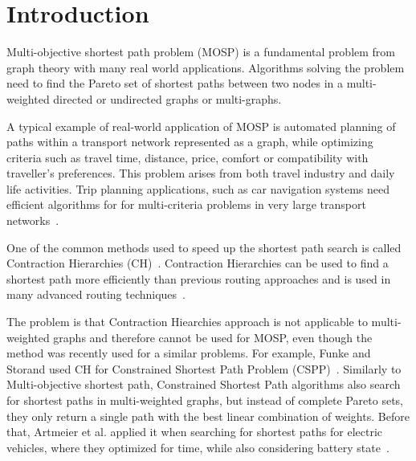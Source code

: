 % 
%  
%  
%  

\section{Introduction} \label{secIntroduction}

Multi-objective shortest path problem (MOSP) is a fundamental problem from
graph theory with many real world applications. Algorithms solving the problem
need to find the Pareto set of shortest paths between two nodes in a
multi-weighted directed or undirected graphs or multi-graphs. 

A typical example of real-world application of MOSP is automated planning of
paths within a transport network represented as a graph, while optimizing
criteria such as travel time, distance, price, comfort or compatibility with
traveller's preferences. This problem arises from both travel industry and
daily life activities. Trip planning applications, such as car navigation
systems need efficient algorithms for for multi-criteria problems in very large
transport networks~\cite{veneti2016time}. 



One of the common methods used to speed up the shortest path search  is called
Contraction Hierarchies (CH)~\cite{geisberger2008contraction}. Contraction
Hierarchies can be used to find a shortest path more efficiently than previous
routing approaches and is used in many advanced routing
techniques~\cite{delling2009engineering}. 

The problem is that Contraction Hiearchies approach is not applicable to multi-weighted
graphs and therefore cannot be used for MOSP, even though the method was
recently used for a similar problems. For example, Funke and Storand used CH for Constrained Shortest Path Problem (CSPP)~\cite{pugliese2013survey,funke2013polynomial}. Similarly to Multi-objective shortest path, Constrained Shortest Path algorithms also search
for shortest paths in multi-weighted graphs, but instead of complete Pareto
sets, they only return a single path with the best linear combination of
weights. Before that, Artmeier et al. applied it when searching for shortest paths for electric vehicles, where they optimized for
time, while also considering battery state~\cite{artmeier2010shortest}. 


